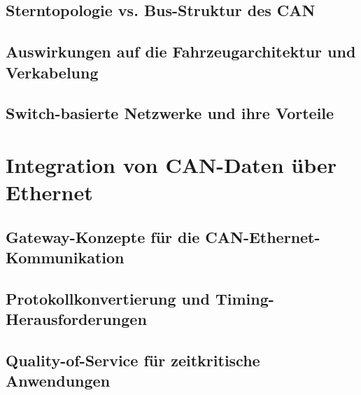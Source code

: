 \section{Sterntopologie vs. Bus-Struktur des CAN}
\section{Auswirkungen auf die Fahrzeugarchitektur und Verkabelung}
\section{Switch-basierte Netzwerke und ihre Vorteile}

\chapter{Integration von CAN-Daten über Ethernet}
\section{Gateway-Konzepte für die CAN-Ethernet-Kommunikation}
\section{Protokollkonvertierung und Timing-Herausforderungen}
\section{Quality-of-Service für zeitkritische Anwendungen}

%

